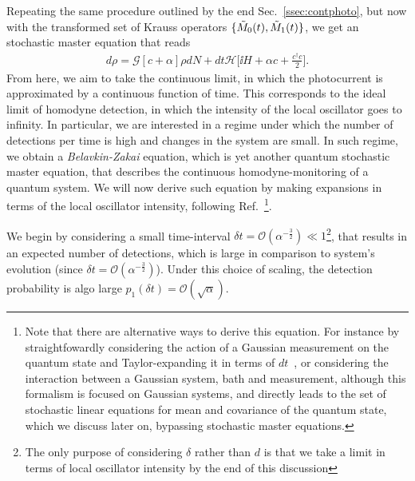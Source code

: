 Repeating the same procedure outlined by the end Sec.~\ref{ssec:contphoto}, but now with the transformed set of Krauss operators $ \lbrace \tilde{M}_0(t), \tilde{M}_1(t)\rbrace$, we get an stochastic master equation that reads
\begin{align}
d\rho = \mathcal{G}[c+\alpha] \rho dN + dt \mathcal{H}\Big[\ii H + \alpha c + \frac{c^\dagger c}{2}\Big].
\end{align}
From here, we aim to take the continuous limit, in which the photocurrent is approximated by a continuous function of time. This corresponds to the ideal limit of homodyne detection, in which the intensity of the local oscillator goes to infinity. In particular, we are interested in a regime under which the number of detections per time is high and changes in the system are small. In such regime, we obtain a \textit{Belavkin-Zakai} equation, which is yet another quantum stochastic master equation, that describes the continuous homodyne-monitoring of a quantum system. We will now derive such equation by making expansions in terms of the local oscillator intensity, following Ref.~\cite{wisemanbook}\footnote{Note that there are alternative ways to derive this equation. For instance by straightfowardly considering the action of a Gaussian measurement on the quantum state and Taylor-expanding it in terms of $dt$~\cite{jacobs_2014, JacobsStraightfoward2006}, or considering the interaction between a Gaussian system, bath and measurement\cite{serafini2017quantum,Genoni2016conditional}, although this formalism is focused on Gaussian systems, and directly leads to the set of stochastic linear equations for mean and covariance of the quantum state, which we discuss later on, bypassing stochastic master equations.}.

We begin by considering a small time-interval $\delta t = \mathcal{O}(\alpha^{-\frac{3}{2}})\ll1$\footnote{The only purpose of considering $\delta$ rather than $d$ is that we take a limit in terms of local oscillator intensity by the end of this discussion}, that results in an expected number of detections,
which is large in comparison to system's evolution (since $\delta t = \mathcal{O}(\alpha^{-\frac{3}{2}})$). Under this choice of scaling, the detection probability is algo large $p_1(\delta t) = \mathcal{O}(\sqrt{\alpha})$.

